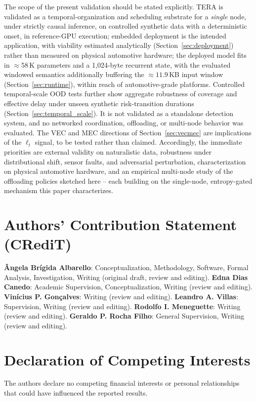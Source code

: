 \documentclass[a4paper,fleqn]{cas-dc}
\begin{document}
The scope of the present validation should be stated explicitly. TERA is validated
as a temporal-organization and scheduling substrate for a \emph{single} node,
under strictly causal inference, on controlled synthetic data with a
deterministic onset{\color{\revcolor}, in reference-GPU execution; embedded
deployment is the intended application, with viability estimated analytically
(Section~\ref{sec:deployment}) rather than measured on physical automotive
hardware}; the deployed model fits in $\approx$58\,K parameters and a
1{,}024-byte recurrent state{\color{\revcolor}, with the evaluated windowed
semantics additionally buffering the ${\approx}11.9$\,KB input window
(Section~\ref{sec:runtime})}, within reach of automotive-grade platforms.
{\color{\revcolor}Controlled temporal-scale OOD tests further show aggregate
robustness of coverage and effective delay under unseen synthetic
risk-transition durations (Section~\ref{sec:temporal_scale}).}
It is not validated as a standalone detection system, and no networked coordination,
offloading, or multi-node behavior was evaluated. The VEC and MEC directions of
Section~\ref{sec:vecmec} are implications of the $\ell_t$ signal, to be tested rather
than claimed. Accordingly, the immediate priorities are external validity on
naturalistic data, robustness under distributional shift, sensor faults, and
adversarial perturbation, characterization on physical automotive hardware, and an
empirical multi-node study of the offloading policies sketched here -- each building
on the single-node, entropy-gated mechanism this paper characterizes.
\section*{Authors' Contribution Statement (CRediT)}
\textbf{{\^A}ngela Br\'igida Albarello}: Conceptualization, Methodology,
Software, Formal Analysis, Investigation, Writing (original draft, review
and editing).
\textbf{Edna Dias Canedo}: Academic Supervision, Conceptualization,
Writing (review and editing).
\textbf{Vin\'icius P. Gon\c{c}alves}: Writing (review and editing).
\textbf{Leandro A. Villas}: Supervision, Writing (review and editing).
\textbf{Rodolfo I. Meneguette}: Writing (review and editing).
\textbf{Geraldo P. Rocha Filho}: General Supervision, Writing (review
and editing).
\section*{Declaration of Competing Interests}
The authors declare no competing financial interests or personal
relationships that could have influenced the reported results.
\end{document}
